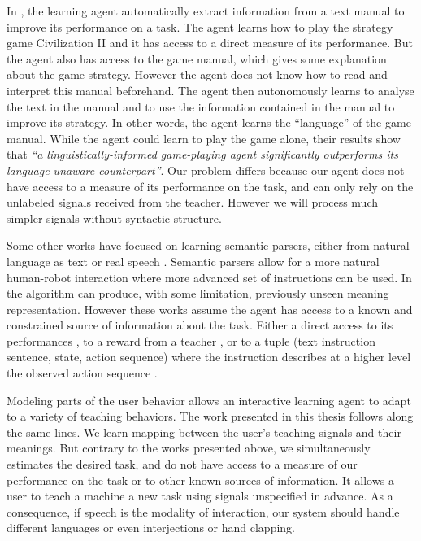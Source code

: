 In \cite{branavan2011learning}, the learning agent automatically extract information from a text manual to improve its performance on a task. The agent learns how to play the strategy game Civilization II and it has access to a direct measure of its performance. But the agent also has access to the game manual, which gives some explanation about the game strategy. However the agent does not know how to read and interpret this manual beforehand. The agent then autonomously learns to analyse the text in the manual and to use the information contained in the manual to improve its strategy. In other words, the agent learns the ``language'' of the game manual. While the agent could learn to play the game alone, their results show that \textit{``a linguistically-informed game-playing agent significantly outperforms its language-unaware counterpart''}. Our problem differs because our agent does not have access to a measure of its performance on the task, and can only rely on the unlabeled signals received from the teacher. However we will process much simpler signals without syntactic structure.

Some other works have focused on learning semantic parsers, either from natural language as text \cite{branavan2011learning,kim2012unsupervised} or real speech \cite{doshi2008spoken}. Semantic parsers allow for a more natural human-robot interaction where more advanced set of instructions can be used. In \cite{kim2012unsupervised} the algorithm can produce, with some limitation, previously unseen meaning representation. However these works assume the agent has access to a known and constrained source of information about the task. Either a direct access to its performances \cite{branavan2011learning}, to a reward from a teacher \cite{doshi2008spoken}, or to a tuple (text instruction sentence, state, action sequence) where the instruction describes at a higher level the observed action sequence \cite{kim2012unsupervised}.

\transition

Modeling parts of the user behavior allows an interactive learning agent to adapt to a variety of teaching behaviors. The work presented in this thesis follows along the same lines. We learn mapping between the user's teaching signals and their meanings. But contrary to the works presented above, we simultaneously estimates the desired task, and do not have access to a measure of our performance on the task or to other known sources of information. It allows a user to teach a machine a new task using signals unspecified in advance. As a consequence, if speech is the modality of interaction, our system should handle different languages or even interjections or hand clapping.

